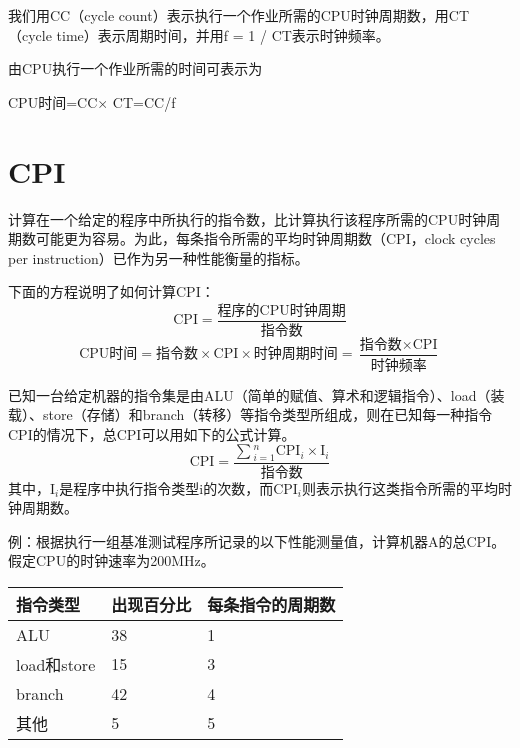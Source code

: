 \begin{figure}[htbp]
\centering
{}
\end{figure}

我们用CC（cycle count）表示执行一个作业所需的CPU时钟周期数，用CT（cycle time）表示周期时间，并用f = 1 / CT表示时钟频率。

由CPU执行一个作业所需的时间可表示为

\begin{center}CPU时间=CC$\times$ CT=CC/f\end{center}

\section{CPI}

计算在一个给定的程序中所执行的指令数，比计算执行该程序所需的CPU时钟周期数可能更为容易。为此，每条指令所需的平均时钟周期数（CPI，clock cycles per instruction）已作为另一种性能衡量的指标。

下面的方程说明了如何计算CPI：$$\text{CPI}=\frac{\text{程序的CPU时钟周期}}{\text{指令数}}$$
$$\text{CPU时间}=\text{指令数}\times\text{CPI}\times\text{时钟周期时间}=\frac{\text{指令数}\times\text{CPI}}{\text{时钟频率}}$$

已知一台给定机器的指令集是由ALU（简单的赋值、算术和逻辑指令）、load（装载）、store（存储）和branch（转移）等指令类型所组成，则在已知每一种指令CPI的情况下，总CPI可以用如下的公式计算。
$$\text{CPI}=\frac{\sum{}^n_{i=1}\text{CPI}_i\times \text{I}_i}{\text{指令数}}$$
其中，$\text{I}_i$是程序中执行指令类型i的次数，而$\text{CPI}_i$则表示执行这类指令所需的平均时钟周期数。

例：根据执行一组基准测试程序所记录的以下性能测量值，计算机器A的总CPI。假定CPU的时钟速率为200MHz。

\begin{table}[htbp]
\centering
\begin{tabular}{|l|l|l|}
\hline
指令类型	& 出现百分比	& 每条指令的周期数	\\
\hline
ALU		& 38		& 1			\\
\hline
load和store	& 15		& 3			\\
\hline
branch		& 42		& 4			\\
\hline
其他		& 5			& 5			\\
\hline
\end{tabular}
\end{table}

